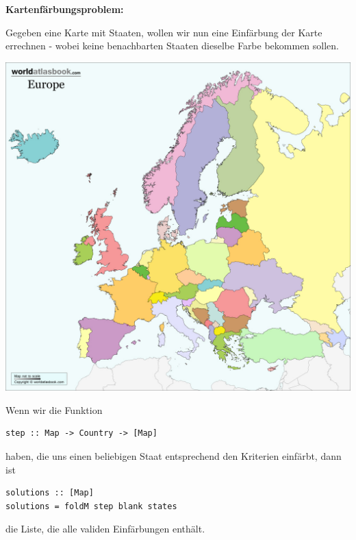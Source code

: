 \documentclass{beamer}
\begin{document}
\begin{frame}
\textbf{Kartenfärbungsproblem:}\bigskip

Gegeben eine Karte mit Staaten, wollen wir nun eine Einfärbung der Karte errechnen - wobei keine benachbarten Staaten dieselbe Farbe bekommen sollen.

\begin{center}
\includegraphics[scale=0.1]{europe-map-colour-printable.jpg} 
\end{center}
\end{frame}

\begin{frame}[fragile]
Wenn wir die Funktion

\begin{verbatim}
step :: Map -> Country -> [Map]
\end{verbatim}

haben, die uns einen beliebigen Staat entsprechend den Kriterien einfärbt, dann ist\pause

\begin{verbatim}
solutions :: [Map]
solutions = foldM step blank states
\end{verbatim}

die Liste, die alle validen Einfärbungen enthält.
\end{frame}
\end{document}
